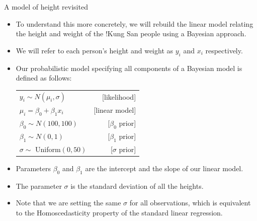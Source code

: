 \documentclass[handout]{beamer}
\begin{document}
\begin{frame}{A model of height revisited}
\scriptsize{
\begin{itemize}
 \item   To understand this more concretely, we will rebuild the linear model relating the height and weight of the !Kung San people using a Bayesian approach.
 
 \item We will refer to each person's height and weight as $y_i$ and $x_i$ respectively.
 
 \item Our probabilistic model specifying all components of a Bayesian model is defined as follows:
 
 \vspace{0.3cm}
 \begin{table}
 \centering
 \begin{tabular}{lr}  
$y_i \sim N(\mu_i,\sigma)$ & [likelihood] \\
$\mu_i = \beta_0 + \beta_1 x_i$ & [linear model] \\
$\beta_0 \sim N(100,100)$ & [$\beta_0$ prior] \\
$\beta_1 \sim N(0,1)$ & [$\beta_1$ prior] \\
$\sigma \sim $ Uniform$(0,50)$ & [$\sigma$ prior] \\
\end{tabular}
\end{table}

 \vspace{0.3cm}

 \item   Parameters $\beta_0$ and $\beta_1$ are the intercept and the slope of our linear model.
 
 \item The parameter $\sigma$ is the standard deviation of all the heights.
 
 \item Note that we are setting the same $\sigma$ for all observations, which is equivalent to the Homoscedasticity property of the standard linear regression. 
 


 
\end{itemize}
 

 
}
\end{frame}
\end{document}
